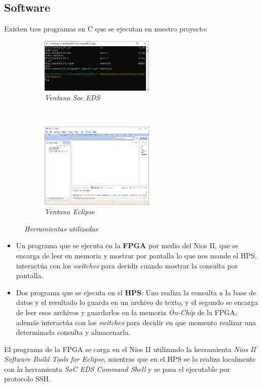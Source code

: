 \documentclass[conference]{IEEEtran}
\begin{document}
\subsection{Software}
Existen tres programas en C que se ejecutan en nuestro proyecto:
\begin{figure}[h]
    \begin{subfigure}[h]{0.5\textwidth}
       \centerline{\includegraphics[width=0.6\textwidth]{img/eds01.png}}
       \caption{\textit{Ventana Soc EDS}}

    \end{subfigure}\\
    \begin{subfigure}[h]{0.5\textwidth}
      \centerline{\includegraphics[width=0.6\textwidth]{img/eclipse.png}}
      \caption{\textit{Ventana Eclipse}}

    \end{subfigure}
    \caption{\textit{Herramientas utilizadas}}
\label{fig:sw01}
\end{figure}
\begin{itemize}
  \item Un programa que se ejecuta en la \textbf{FPGA} por medio del Nios II, que se encarga de leer en memoria y mostrar por pantalla lo que nos mande el HPS, interactúa con los \textit{switches} para decidir cuando mostrar la consulta por pantalla.
  \item Dos programa que se ejecuta en el \textbf{HPS}. Uno realiza la consulta a la base de datos y el resultado lo guarda en un archivo de texto, y el segundo se encarga de leer esos archivos y guardarlos en la memoria \textit{On-Chip} de la FPGA, además interactúa con los \textit{switches} para decidir en que momento realizar una determinada consulta y almacenarla.
\end{itemize}
El programa de la FPGA se carga en el Nios II utilizando la herramienta \textit{Nios II Software Build Tools for Eclipse}, mientras que en el HPS se lo realiza localmente con la herramienta \textit{SoC EDS Command Shell} y se pasa el ejecutable por protocolo SSH.
\end{document}
